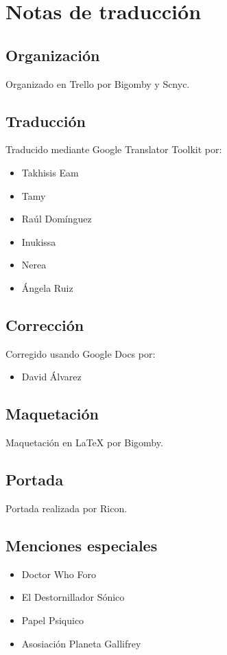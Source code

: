\section*{Notas de traducción}

\subsection*{Organización}\label{organizaciuxf3n}

Organizado en Trello por Bigomby y Scnyc.

\subsection*{Traducción}\label{traducciuxf3n}

Traducido mediante Google Translator Toolkit por:

\begin{itemize}
\itemsep1pt\parskip0pt
\item
  Takhisis Eam
\item
  Tamy
\item
  Raúl Domínguez
\item
  Inukissa
\item
  Nerea
\item
  Ángela Ruiz
\end{itemize}

\subsection*{Corrección}\label{correcciuxf3n}

Corregido usando Google Docs por:

\begin{itemize}
\itemsep1pt\parskip0pt
\item
  David Álvarez
\end{itemize}

\subsection*{Maquetación}\label{maquetaciuxf3n}

Maquetación en LaTeX por Bigomby.

\subsection*{Portada}\label{portada}

Portada realizada por Ricon.

\subsection*{Menciones especiales}\label{menciones-especiales}

\begin{itemize}
\itemsep1pt\parskip0pt
\item
  Doctor Who Foro
\item
  El Destornillador Sónico
\item
  Papel Psiquico
\item
  Asosiación Planeta Gallifrey
\end{itemize}
